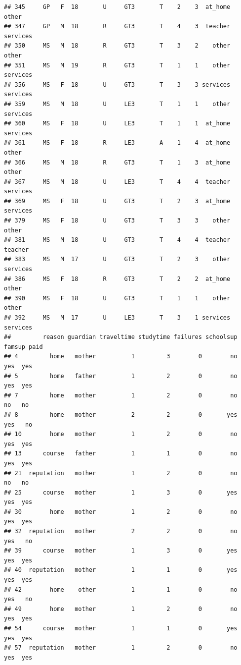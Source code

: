 \documentclass[
]{article}
\begin{document}
\begin{verbatim}
## 345     GP   F  18       U     GT3       T    2    3  at_home    other
## 347     GP   M  18       R     GT3       T    4    3  teacher services
## 350     MS   M  18       R     GT3       T    3    2    other    other
## 351     MS   M  19       R     GT3       T    1    1    other services
## 356     MS   F  18       U     GT3       T    3    3 services services
## 359     MS   M  18       U     LE3       T    1    1    other services
## 360     MS   F  18       U     LE3       T    1    1  at_home services
## 361     MS   F  18       R     LE3       A    1    4  at_home    other
## 366     MS   M  18       R     GT3       T    1    3  at_home    other
## 367     MS   M  18       U     LE3       T    4    4  teacher services
## 369     MS   F  18       U     GT3       T    2    3  at_home services
## 379     MS   F  18       U     GT3       T    3    3    other    other
## 381     MS   M  18       U     GT3       T    4    4  teacher  teacher
## 383     MS   M  17       U     GT3       T    2    3    other services
## 386     MS   F  18       R     GT3       T    2    2  at_home    other
## 390     MS   F  18       U     GT3       T    1    1    other    other
## 392     MS   M  17       U     LE3       T    3    1 services services
##         reason guardian traveltime studytime failures schoolsup famsup paid
## 4         home   mother          1         3        0        no    yes  yes
## 5         home   father          1         2        0        no    yes  yes
## 7         home   mother          1         2        0        no     no   no
## 8         home   mother          2         2        0       yes    yes   no
## 10        home   mother          1         2        0        no    yes  yes
## 13      course   father          1         1        0        no    yes  yes
## 21  reputation   mother          1         2        0        no     no   no
## 25      course   mother          1         3        0       yes    yes  yes
## 30        home   mother          1         2        0        no    yes  yes
## 32  reputation   mother          2         2        0        no    yes   no
## 39      course   mother          1         3        0       yes    yes  yes
## 40  reputation   mother          1         1        0       yes    yes  yes
## 42        home    other          1         1        0        no    yes   no
## 49        home   mother          1         2        0        no    yes  yes
## 54      course   mother          1         1        0       yes    yes  yes
## 57  reputation   mother          1         2        0        no    yes  yes

\end{verbatim}
\end{document}
